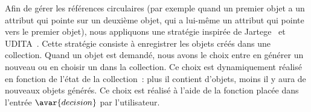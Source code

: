 Afin de gérer les références circulaires (par exemple quand un premier objet a
un attribut qui pointe sur un deuxième objet, qui a lui-même un attribut qui
pointe vers le premier objet), nous appliquons une stratégie inspirée de
Jartege~ et UDITA~. Cette stratégie
consiste à enregistrer les objets créés dans une collection. Quand un objet est
demandé, nous avons le choix entre en générer un nouveau ou en choisir un dans
la collection. Ce choix est dynamiquement réalisé en fonction de l'état de la
collection~: plus il contient d'objets, moins il y aura de nouveaux objets
générés. Ce choix est réalisé à l'aide de la fonction placée dans l'entrée
$\avar{decision}$ par l'utilisateur.

